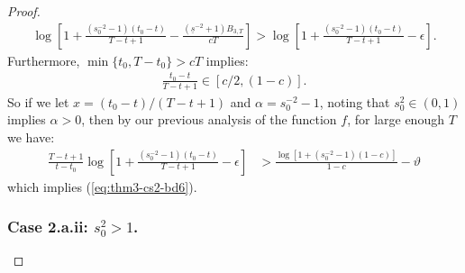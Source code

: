 \begin{proof}
\begin{align*}
     \log\left[1 + \frac{\left(s_0^{-2} -1\right)(t_0 - t)}{T - t + 1} - \frac{\left(\underline{s}^{-2} + 1\right) B_{3,T}}{cT} \right] > \log\left[1 + \frac{\left(s_0^{-2} -1\right)(t_0 - t)}{T - t + 1} - \epsilon\right].
\end{align*}
Furthermore, $\min\{t_0,T-t_0\} > cT$ implies: 
\begin{align*}
    \frac{t_0 - t}{T - t + 1} \in [c/2, (1-c)].
\end{align*}
So if we let $x = (t_0 - t)/(T - t + 1)$ and $\alpha = s_0^{-2} -1$, noting that $s_0^{2}  \in (0,1)$ implies $\alpha > 0$, then by our previous analysis of the function $f$, for large enough $T$ we have:
\begin{align*}
    \frac{T-t+1}{t-t_0}\log\left[1 + \frac{\left(s_0^{-2} -1\right)(t_0 - t)}{T - t + 1} - \epsilon\right] &> \frac{\log[1 +  (s_0^{-2} -1)(1-c)]}{1-c} - \vartheta
\end{align*}
which implies (\ref{eq:thm3-cs2-bd6}).

\subsubsection*{Case 2.a.ii: $s_0^2 > 1$.}


\end{proof}
